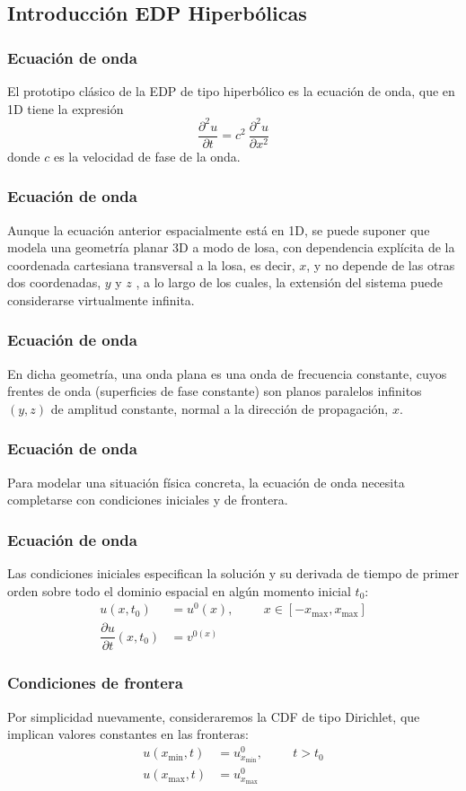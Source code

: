 \subsection{Introducción EDP Hiperbólicas}
\begin{frame}
\frametitle{Ecuación de onda}
El prototipo clásico de la EDP de tipo hiperbólico es la ecuación de onda, que en 1D tiene la expresión
\begin{equation}
\dfrac{\partial^{2} u }{\partial t} = c^{2} \: \dfrac{\partial^{2} u}{\partial x^{2}}
\label{eq:ecuacion_13_122}
\end{equation}
donde $c$ es la velocidad de fase de la onda.
\end{frame}
\begin{frame}
\frametitle{Ecuación de onda}
Aunque la ecuación anterior espacialmente está en 1D, se puede suponer que modela una geometría planar 3D a modo de losa, con dependencia explícita de la coordenada cartesiana transversal a la losa, es decir, $x$, y no depende de las otras dos coordenadas, $y$ y $z$ , a lo largo de los cuales, la extensión del sistema puede considerarse virtualmente infinita.
\end{frame}
\begin{frame}
\frametitle{Ecuación de onda}
En dicha geometría, una onda plana es una onda de frecuencia constante, cuyos frentes de onda (superficies de fase constante) son planos paralelos infinitos $(y, z)$ de amplitud constante, normal a la dirección de propagación, $x$.
\end{frame}
\begin{frame}
\frametitle{Ecuación de onda}
Para modelar una situación física concreta, la ecuación de onda necesita completarse con condiciones iniciales y de frontera.
\end{frame}
\begin{frame}
\frametitle{Ecuación de onda}
Las condiciones iniciales especifican la solución y su derivada de tiempo de primer orden sobre todo el dominio espacial en algún momento inicial $t_{0}$:
\begin{align}
u(x, t_{0}) &= u^{0}(x), \hspace{1cm} x \in [-x_{\text{max}}, x_{\text{max}}] \label{eq:ecuacion_13_123} \\
\dfrac{\partial u}{\partial t} (x, t_{0}) &= v^{0(x)} \label{eq:ecuacion_13_124}
\end{align}
\end{frame}
\begin{frame}
\frametitle{Condiciones de frontera}
Por simplicidad nuevamente, consideraremos la CDF de tipo Dirichlet, que implican valores constantes en las fronteras:
\begin{align}
u(x_\text{min}, t) &= u_{x_{\text{min}}}^0, \hspace{1cm} t > t_{0} \label{eq:ecuacion_13_125} \\
u(x_\text{max}, t) &= u_{x_{\text{max}}}^0 \label{eq:ecuacion_13_126}
\end{align}
\end{frame}

